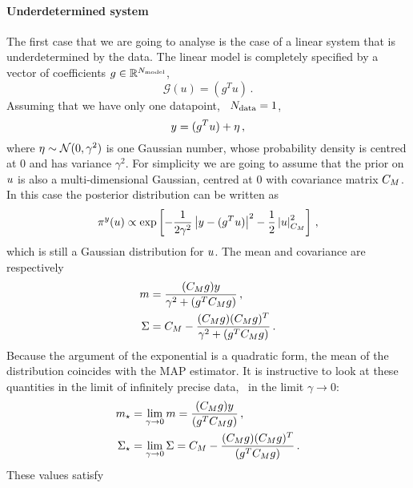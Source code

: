 \paragraph{Underdetermined system}
The first case that we are going to analyse is the case of a linear system that
is underdetermined by the data. The linear model is completely specified by a
vector of coefficients $g\in \mathbb{R}^{N_{\rm model}}$, 
\begin{equation}
  \label{eq:LinSyst}
  \mathcal{G}(u) = \left(g^T u\right)\, .
\end{equation}
Assuming that we have only one datapoint, \ie\ $N_{\rm data}=1$, 
\begin{equation}
  \label{eq:LinearModelEx}
  y = (g^T u) + \eta\, ,
\end{equation}
where $\eta \sim \mathcal{N}(0,\gamma^2)$ is one Gaussian number, whose
probability density is centred at $0$ and has variance $\gamma^2$. For
simplicity we are going to assume that the prior on $u$ is also a
multi-dimensional Gaussian, centred at $0$ with covariance matrix $C_M$. In
this case the posterior distribution can be written as
\begin{equation}
  \label{eq:GaussPostExplicit}
    \pi^y(u) \propto \exp \left[
    -\frac{1}{2\gamma^2} \left|y - (g^T u) \right|^2 - \frac12 \left|
      u
    \right|_{C_M}^2 
    \right]\, ,
\end{equation}
which is still a Gaussian distribution for $u$. The mean and covariance are
respectively
\begin{align}
  m &= \frac{(C_M g) y}{\gamma^2 + (g^T C_M g)}\, , \\
  \Sigma &= C_M - 
  \frac{(C_M g) (C_M g)^T}{\gamma^2 + (g^T C_M g)}\, .
\end{align}
Because the argument of the exponential is a quadratic form, the mean of the
distribution coincides with the MAP estimator. It is instructive to look at
these quantities in the limit of infinitely precise data, \ie\ in the limit
$\gamma\to 0$:
\begin{align}
  m_\star &= 
  \lim_{\gamma\to 0} m
  = \frac{(C_M g) y}{(g^T C_M g)}\, , \\
  \Sigma_\star &= 
  \lim_{\gamma\to 0} \Sigma 
  = C_M - 
  \frac{(C_M g) (C_M g)^T}{(g^T C_M g)}\, .
\end{align}
These values satisfy

